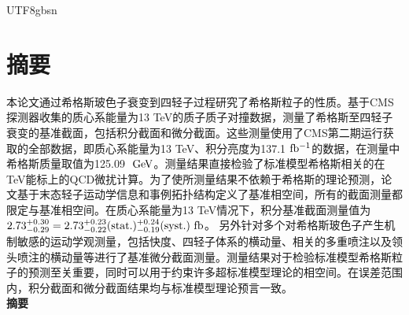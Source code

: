 \begin{CJK}{UTF8}{gbsn}
\chapter{摘要}
本论文通过希格斯玻色子衰变到四轻子过程研究了希格斯粒子的性质。基于CMS探测器收集的质心系能量为13 TeV的质子质子对撞数据，测量了希格斯至四轻子衰变的基准截面，包括积分截面和微分截面。这些测量使用了CMS第二期运行获取的全部数据，即质心系能量为13 TeV、积分亮度为137.1 $\mathrm{fb^{-1}}$的数据，在测量中希格斯质量取值为125.09 $\hbox{$\;\hbox{\rm GeV}$}$。测量结果直接检验了标准模型希格斯相关的在TeV能标上的QCD微扰计算。为了使所测量结果不依赖于希格斯的理论预测，论文基于末态轻子运动学信息和事例拓扑结构定义了基准相空间，所有的截面测量都限定与基准相空间。在质心系能量为13 TeV情况下，积分基准截面测量值为$2.73^{+0.30}_{-0.29}=2.73^{+0.23}_{-0.22}({\rm stat.})^{+0.24}_{-0.19}({\rm syst.})~{\rm fb}$。 另外针对多个对希格斯玻色子产生机制敏感的运动学观测量，包括快度、四轻子体系的横动量、相关的多重喷注以及领头喷注的横动量等进行了基准微分截面测量。测量结果对于检验标准模型希格斯粒子的预测至关重要，同时可以用于约束许多超标准模型理论的相空间。在误差范围内，积分截面和微分截面结果均与标准模型理论预言一致。\\
	\textbf{摘要}


\end{CJK}
